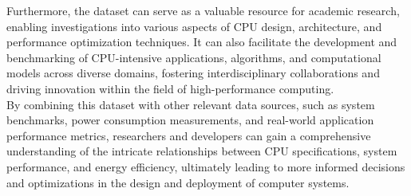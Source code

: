 Furthermore, the dataset can serve as a valuable resource for academic research, enabling investigations into various aspects of CPU design, architecture, and performance optimization techniques. It can also facilitate the development and benchmarking of CPU-intensive applications, algorithms, and computational models across diverse domains, fostering interdisciplinary collaborations and driving innovation within the field of high-performance computing.\\

By combining this dataset with other relevant data sources, such as system benchmarks, power consumption measurements, and real-world application performance metrics, researchers and developers can gain a comprehensive understanding of the intricate relationships between CPU specifications, system performance, and energy efficiency, ultimately leading to more informed decisions and optimizations in the design and deployment of computer systems.\\


\newpage